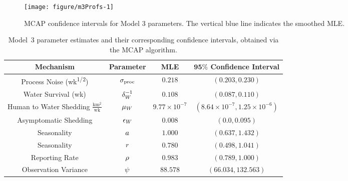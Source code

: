 \begin{figure}[ht]
\begin{knitrout}
\color{fgcolor}
\texttt{[image: figure/m3Profs-1]} 
\end{knitrout}
\caption[MCAP confidence intervals for Model 3 parameters.]{\label{fig:m3Profs}MCAP confidence intervals for Model 3 parameters. The vertical blue line indicates the smoothed MLE.}
\end{figure}

\begin{table}[!h]
\centering
\caption[Model~3 parameter estimates and confidence intervals.]{\label{tab:mod3CI}Model~3 parameter estimates and their corresponding confidence intervals, obtained via the MCAP algorithm.}
\vspace{2mm}
\begin{tabular}{|c|c|c|c|}
\hline
\textbf{Mechanism} & \textbf{Parameter} & \textbf{MLE} & $\bm{95\%}$ \textbf{Confidence Interval}
\\
\hline
\hline

 Process Noise {\small (wk\textsuperscript{1/2})} & $\sigma_{\mathrm{proc}}$ & $0.218$
   &
  $(0.203, 0.230)$
\\
\hline

 Water Survival {\small (wk)} & $\delta_W^{-1}$ & $0.108$
   &
  $(0.087, 0.110)$
\\
\hline

 Human to Water Shedding {\small $\frac{\mathrm{km^2}}{\mathrm{wk}}$} & $\mu_W$ & $\ensuremath{9.77\times 10^{-7}}$
   &
  $(\ensuremath{8.64\times 10^{-7}}, \ensuremath{1.25\times 10^{-6}})$
\\
\hline

 Asymptomatic Shedding & $\epsilon_{W}$ & $0.008$
   &
  $(0.0, 0.095)$
\\
\hline

 Seasonality & $a$ & $1.000$
   &
  $(0.637, 1.432)$
\\
\hline

 Seasonality & $r$ & $0.780$
   &
  $(0.498, 1.041)$
\\
\hline

 Reporting Rate & $\rho$ & $0.983$
   &
  $(0.789, 1.000)$
\\
\hline

 Observation Variance & $\psi$ & $88.578$
   &
  $(66.034, 132.563)$
\\
\hline

\end{tabular}
\end{table}


